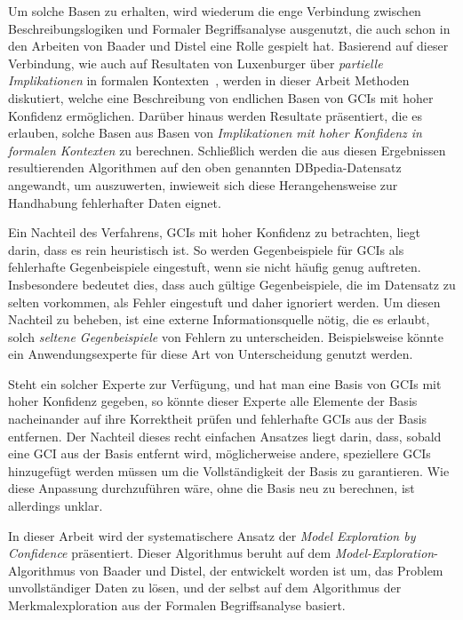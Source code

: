 \documentclass[ngerman,fleqn,DIV=12]{scrartcl}
\begin{document}
Um solche Basen zu erhalten, wird wiederum die enge Verbindung zwischen
Beschreibungslogiken und Formaler Begriffsanalyse ausgenutzt, die auch schon in den
Arbeiten von Baader und Distel eine Rolle gespielt hat.  Basierend auf dieser Verbindung,
wie auch auf Resultaten von Luxenburger über \emph{partielle Implikationen} in formalen
Kontexten~\cite{diss:Luxenburger}, werden in dieser Arbeit Methoden diskutiert, welche
eine Beschreibung von endlichen Basen von GCIs mit hoher Konfidenz ermöglichen.  Darüber
hinaus werden Resultate präsentiert, die es erlauben, solche Basen aus Basen von
\emph{Implikationen mit hoher Konfidenz in formalen Kontexten} zu berechnen.  Schließlich
werden die aus diesen Ergebnissen resultierenden Algorithmen auf den oben genannten
DBpedia-Datensatz angewandt, um auszuwerten, inwieweit sich diese Herangehensweise zur
Handhabung fehlerhafter Daten eignet.

Ein Nachteil des Verfahrens, GCIs mit hoher Konfidenz zu betrachten, liegt darin, dass es
rein heuristisch ist.  So werden Gegenbeispiele für GCIs als fehlerhafte Gegenbeispiele
eingestuft, wenn sie nicht häufig genug auftreten.  Insbesondere bedeutet dies, dass auch
gültige Gegenbeispiele, die im Datensatz zu selten vorkommen, als Fehler eingestuft und
daher ignoriert werden.  Um diesen Nachteil zu beheben, ist eine externe
Informationsquelle nötig, die es erlaubt, solch \emph{seltene Gegenbeispiele} von Fehlern
zu unterscheiden.  Beispielsweise könnte ein Anwendungsexperte für diese Art von
Unterscheidung genutzt werden.

Steht ein solcher Experte zur Verfügung, und hat man eine Basis von GCIs mit hoher
Konfidenz gegeben, so könnte dieser Experte alle Elemente der Basis nacheinander auf ihre
Korrektheit prüfen und fehlerhafte GCIs aus der Basis entfernen.  Der Nachteil dieses
recht einfachen Ansatzes liegt darin, dass, sobald eine GCI aus der Basis entfernt wird,
möglicherweise andere, speziellere GCIs hinzugefügt werden müssen um die Vollständigkeit
der Basis zu garantieren.  Wie diese Anpassung durchzuführen wäre, ohne die Basis neu zu
berechnen, ist allerdings unklar.

In dieser Arbeit wird der systematischere Ansatz der \emph{Model Exploration by
  Confidence} präsentiert.  Dieser Algorithmus beruht auf dem
\emph{Model-Exploration}-Algorithmus von Baader und Distel, der entwickelt worden ist um,
das Problem unvollständiger Daten zu lösen, und der selbst auf dem Algorithmus der
Merkmalexploration aus der Formalen Begriffsanalyse basiert.
\end{document}
